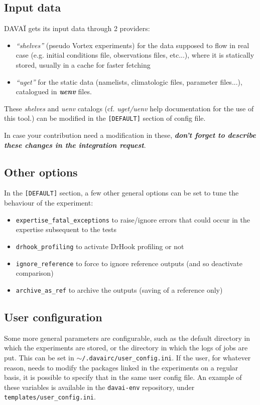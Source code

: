 \documentclass[a4paper,10pt,twoside]{article}
\begin{document}
\subsection{Input data}
DAVAÏ gets its input data through 2 providers:
\begin{itemize}
 \item \textit{``shelves''} (pseudo Vortex experiments) for the data supposed to flow in real case (e.g. initial conditions file, observations files, etc...), where it is statically stored, usually in a cache for faster fetching
 \item \textit{``uget''} for the static data (namelists, climatologic files, parameter files...), catalogued in \textit{\textbf{uenv}} files.
\end{itemize}

These \textit{shelves} and \textit{uenv} catalogs (cf. \textit{uget/uenv} help documentation for the use of this tool.) can be modified in the \texttt{[DEFAULT]} section of config file.

In case your contribution need a modification in these, \textbf{\textit{don't forget to describe these changes in the integration request}}.



\subsection{Other options}
In the \texttt{[DEFAULT]} section, a few other general options can be set to tune the behaviour of the experiment:
\begin{itemize}
 \item \texttt{expertise\_fatal\_exceptions} to raise/ignore errors that could occur in the expertise subsequent to the tests
 \item \texttt{drhook\_profiling} to activate DrHook profiling or not
 \item \texttt{ignore\_reference} to force to ignore reference outputs (and so deactivate comparison)
 \item \texttt{archive\_as\_ref} to archive the outputs (saving of a reference only)
\end{itemize}


\subsection{User configuration}
Some more general parameters are configurable, such as the default directory in which the experiments are stored, or the directory in which the logs of jobs are put. This can be set in \texttt{$\sim$/.davairc/user\_config.ini}.
If the user, for whatever reason, needs to modify the packages linked in the experiments on a regular basis, it is possible to specify that in the same user config file.
An example of these variables is available in the \texttt{davai-env} repository, under \texttt{templates/user\_config.ini}.
\end{document}
